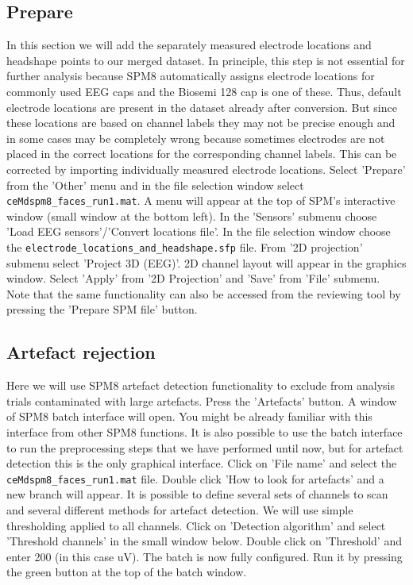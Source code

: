\subsection{Prepare}
In this section we will add the separately measured electrode locations and headshape points to our merged dataset. In principle, this step is not essential for further analysis because SPM8 automatically assigns electrode locations for commonly used EEG caps and the Biosemi 128 cap is one of these. Thus, default electrode locations are present in the dataset already after conversion. But since these locations are based on channel labels they may not be precise enough and in some cases may be completely wrong because sometimes electrodes are not placed in the correct locations for the corresponding channel labels. This can be corrected by importing individually measured electrode locations. Select 'Prepare' from the 'Other' menu and in the file selection window select \texttt{ceMdspm8\_faces_run1.mat}. A menu will appear at the top of SPM's interactive window (small window at the bottom left). In the 'Sensors' submenu choose 'Load EEG sensors'/'Convert locations file'. In the file selection window choose the \texttt{electrode_locations_and_headshape.sfp} file. From '2D projection' submenu select 'Project 3D (EEG)'. 2D channel layout will appear in the graphics window. Select 'Apply' from '2D Projection' and 'Save' from 'File' submenu. Note that the same functionality can also be accessed from the reviewing tool by pressing the 'Prepare SPM file' button.

\subsection{Artefact rejection}
Here we will use SPM8 artefact detection functionality to exclude from analysis trials contaminated with large artefacts. Press the 'Artefacts' button. A window of SPM8 batch interface will open. You might be already familiar with this interface from other SPM8 functions. It is also possible to use the batch interface to run the preprocessing steps that we have performed until now, but for artefact detection this is the only graphical interface. Click on 'File name' and select the \verb!ceMdspm8_faces_run1.mat! file.  Double click 'How to look for artefacts' and a new branch will appear. It is possible to define several sets of channels to scan and several different methods for artefact detection. We will use simple thresholding applied to all channels. Click on 'Detection algorithm' and select 'Threshold channels' in the small window below. Double click on 'Threshold' and enter 200 (in this case uV). The batch is now fully configured. Run it by pressing the green button at the top of the batch window. 

